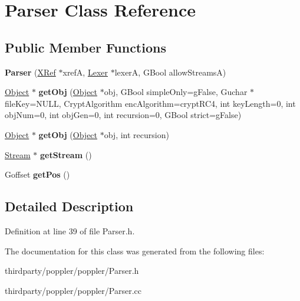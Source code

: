 \hypertarget{class_parser}{}\section{Parser Class Reference}
\label{class_parser}
\subsection*{Public Member Functions}
\begin{DoxyCompactItemize}
\item 
\mbox{\label{class_parser_a25fe11a2154baeae58851a729a87a3a2}} 
{\bfseries Parser} (\hyperlink{class_x_ref}{X\+Ref} $\ast$xrefA, \hyperlink{class_lexer}{Lexer} $\ast$lexerA, G\+Bool allow\+StreamsA)
\item 
\mbox{\label{class_parser_a5e221c96a88765c39fbea32e90d11635}} 
\hyperlink{class_object}{Object} $\ast$ {\bfseries get\+Obj} (\hyperlink{class_object}{Object} $\ast$obj, G\+Bool simple\+Only=g\+False, Guchar $\ast$file\+Key=N\+U\+LL, Crypt\+Algorithm enc\+Algorithm=crypt\+R\+C4, int key\+Length=0, int obj\+Num=0, int obj\+Gen=0, int recursion=0, G\+Bool strict=g\+False)
\item 
\mbox{\label{class_parser_aee3ab01ae73cb6f30f8f2a8303fe2ba2}} 
\hyperlink{class_object}{Object} $\ast$ {\bfseries get\+Obj} (\hyperlink{class_object}{Object} $\ast$obj, int recursion)
\item 
\mbox{\label{class_parser_a5813344ad99e68256356c1a1267998e5}} 
\hyperlink{class_stream}{Stream} $\ast$ {\bfseries get\+Stream} ()
\item 
\mbox{\label{class_parser_a8b5a3ee94bff36ed04cc886f39de8c50}} 
Goffset {\bfseries get\+Pos} ()
\end{DoxyCompactItemize}


\subsection{Detailed Description}


Definition at line 39 of file Parser.\+h.



The documentation for this class was generated from the following files\+:\begin{DoxyCompactItemize}
\item 
thirdparty/poppler/poppler/Parser.\+h\item 
thirdparty/poppler/poppler/Parser.\+cc\end{DoxyCompactItemize}
